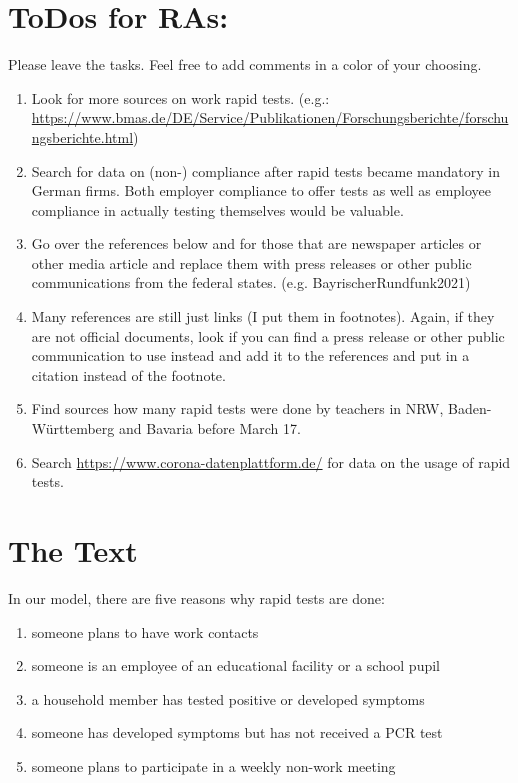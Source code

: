 
\section{ToDos for RAs:}

Please leave the tasks. Feel free to add comments in a color of your choosing.

\begin{enumerate}
  \item Look for more sources on work rapid tests. (e.g.: \url{https://www.bmas.de/DE/Service/Publikationen/Forschungsberichte/forschungsberichte.html})
  \item Search for data on (non-) compliance after rapid tests became mandatory in German
  firms. Both employer compliance to offer tests as well as employee compliance in
  actually testing themselves would be valuable.
  \item Go over the references below and for those that are newspaper articles or other
  media article and replace them with press releases or other public communications from
  the federal states. (e.g. BayrischerRundfunk2021)
  \item Many references are still just links (I put them in footnotes). Again, if they
  are not official documents, look if you can find a press release or other public
  communication to use instead and add it to the references and put in a citation instead of the
  footnote.
  \item Find sources how many rapid tests were done by teachers in NRW, Baden-Württemberg
  and Bavaria before March 17.

  \item Search \url{https://www.corona-datenplattform.de/} for data on the usage of rapid tests.
\end{enumerate}


\section{The Text}


In our model, there are five reasons why rapid tests are done:
\begin{enumerate}
    \item someone plans to have work contacts
    \item someone is an employee of an educational facility or a school pupil
    \item a household member has tested positive or developed symptoms
    \item someone has developed symptoms but has not received a PCR test
    \item someone plans to participate in a weekly non-work meeting
\end{enumerate}

